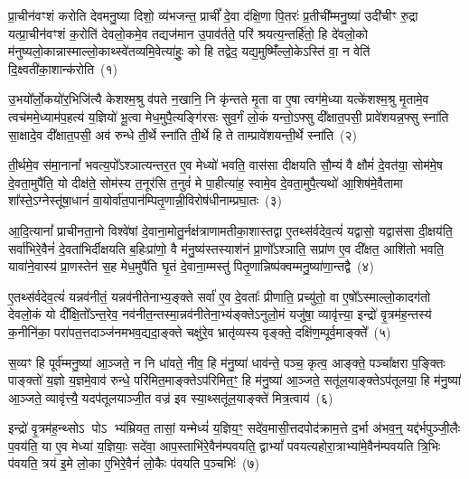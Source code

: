 \setcounter{anuvakam}{0}
प्रा॒चीन॑वꣳशं करोति देवमनु॒ष्या दिशो॒ व्य॑भजन्त॒ प्राचीं᳚ दे॒वा द॑क्षि॒णा पि॒तरः॑ प्र॒तीची᳚म्मनु॒ष्या॑ उदी॑चीꣳ रु॒द्रा यत्प्रा॒चीन॑वꣳशं क॒रोति॑ देवलो॒कमे॒व तद्यज॑मान उ॒पाव॑र्तते॒ परि॑ श्रयत्य॒न्तर्\mbox{}हि॑तो॒ हि दे॑वलो॒को म॑नुष्यलो॒का\-न्नास्माल्लो॒काथ्स्वे॑तव्यमि॒वेत्या॑हुः॒ को हि तद्वेद॒ यद्य॒मुष्मिँ॑ल्लो॒के\-ऽस्ति॑ वा॒ न वेति॑ दि॒क्ष्वती॑का॒शान्क॑रोति~(१)

उ॒भयो᳚र्लो॒कयो॑र॒भिजि॑त्यै केशश्म॒श्रु व॑पते न॒खानि॒ नि कृ॑न्तते मृ॒ता वा ए॒षा त्वग॑मे॒ध्या यत्के॑शश्म॒श्रु मृ॒तामे॒व त्वच॑ममे॒ध्याम॑प॒हत्य॑ य॒ज्ञियो॑ भू॒त्वा मेध॒मुपै॒त्यङ्गि॑रसः सुव॒र्गं लो॒कं यन्तो॒\-ऽफ्सु दी᳚क्षात॒पसी॒ प्रावे॑शयन्न॒फ्सु स्ना॑ति सा॒क्षादे॒व दी᳚क्षात॒पसी॒ अव॑ रुन्धे ती॒र्थे स्ना॑ति ती॒र्थे हि ते ताम्प्रावे॑शयन्ती॒र्थे स्ना॑ति~(२)

ती॒र्थमे॒व स॑मा॒नानां᳚ भवत्य॒पो᳚\-ऽश्ञात्यन्तर॒त ए॒व मेध्यो॑ भवति॒ वास॑सा दीक्षयति सौ॒म्यं वै क्षौमं॑ दे॒वत॑या॒ सोम॑मे॒ष दे॒वता॒मुपै॑ति॒ यो दीक्ष॑ते॒ सोम॑स्य त॒नूर॑सि त॒नुवं॑ मे पा॒हीत्या॑ह॒ स्वामे॒व दे॒वता॒मुपै॒त्यथो॑ आ॒शिष॑मे॒वैतामा शा᳚स्ते॒\-ऽग्नेस्तू॑षा॒धानं॑ वा॒योर्वा॑त॒पान॑म्पितृ॒णान्नी॒विरोष॑धीनाम्प्रघा॒तः~(३)

आ॒दि॒त्यानां᳚ प्राचीनता॒नो विश्वे॑षां दे॒वाना॒मोतु॒र्नक्ष॑त्राणामतीका॒शास्तद्वा ए॒तथ्स॑र्वदेव॒त्यं॑ यद्वासो॒ यद्वास॑सा दी॒क्षय॑ति॒ सर्वा॑भिरे॒वैनं॑ दे॒वता॑भिर्दीक्षयति ब॒हिःप्रा॑णो॒ वै म॑नु॒ष्य॑स्तस्याश॑नं प्रा॒णो᳚\-ऽश्ञाति॒ सप्रा॑ण ए॒व दी᳚क्षत॒ आशि॑तो भवति॒ यावा॑ने॒वास्य॑ प्रा॒णस्तेन॑ स॒ह मेध॒मुपै॑ति घृ॒तं दे॒वाना॒म्मस्तु॑ पितृ॒णान्निष्प॑क्वम्मनु॒ष्या॑णा॒न्तद्वै~(४)

ए॒तथ्स॑र्वदेव॒त्यं॑ यन्नव॑नीतं॒ यन्नव॑नीतेनाभ्य॒ङ्क्ते सर्वा॑ ए॒व दे॒वताः᳚ प्रीणाति॒ प्रच्यु॑तो॒ वा ए॒षो᳚\-ऽस्माल्लो॒कादग॑तो देवलो॒कं यो दी᳚क्षि॒तो᳚\-ऽन्त॒रेव॒ नव॑नीत॒न्तस्मा॒न्नव॑नीतेना॒भ्य॑ङ्क्ते\-ऽनुलो॒मं यजु॑षा॒ व्यावृ॑त्त्या॒ इन्द्रो॑ वृ॒त्रम॑ह॒न्तस्य॑ क॒नीनि॑का॒ परा॑पत॒त्तदाञ्ज॑नमभव॒द्यदा॒ङ्क्ते चक्षु॑रे॒व भ्रातृ॑व्यस्य वृङ्क्ते॒ दक्षि॑ण॒म्पूर्व॒माङ्क्ते᳚~(५)

स॒व्यꣳ हि पूर्व॑म्मनु॒ष्या॑ आ॒ञ्जते॒ न नि धा॑वते॒ नीव॒ हि म॑नु॒ष्या॑ धाव॑न्ते॒ पञ्च॒ कृत्व॒ आङ्क्ते॒ पञ्चा᳚क्षरा प॒ङ्क्तिः पाङ्क्तो॑ य॒ज्ञो य॒ज्ञमे॒वाव॑ रुन्धे॒ परि॑मित॒माङ्क्ते\-ऽप॑रिमित॒ꣳ॒ हि म॑नु॒ष्या॑ आ॒ञ्जते॒ सतू॑ल॒याङ्क्ते\-ऽप॑तूलया॒ हि म॑नु॒ष्या॑ आ॒ञ्जते॒ व्यावृ॑त्त्यै॒ यदप॑तूलयाञ्जी॒त वज्र॑ इव स्या॒थ्सतू॑ल॒याङ्क्ते॑ मित्र॒त्वाय॑~(६)

इन्द्रो॑ वृ॒त्रम॑ह॒न्थ्सो\-ऽ पो\-ऽ भ्य॑म्रियत॒ तासां॒ यन्मेध्यं॑ य॒ज्ञिय॒ꣳ॒ सदे॑व॒मासी॒त्तदपोद॑क्राम॒त्ते द॒र्भा अ॑भव॒न्॒ यद्द॑र्भपुञ्जी॒लैः प॒वय॑ति॒ या ए॒व मेध्या॑ य॒ज्ञियाः॒ सदे॑वा॒ आप॒स्ताभि॑रे॒वैन॑म्पवयति॒ द्वा\-भ्यां᳚ पवयत्यहोरा॒त्राभ्या॑मे॒वैन॑म्पवयति त्रि॒भिः प॑वयति॒ त्रय॑ इ॒मे लो॒का ए॒भिरे॒वैनं॑ लो॒कैः प॑वयति प॒ञ्चभिः॑~(७)

